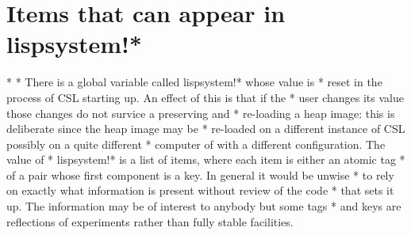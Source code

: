 \documentclass[a4paper,11pt]{article}
\begin{document}
\section{Items that can appear in {\ttfamily lispsystem!*}} \label{lispsys}
  *
  * There is a global variable called {\ttfamily lispsystem!*} whose value is
  * reset in the process of CSL starting up. An effect of this is that if the
  * user changes its value those changes do not survice a preserving and
  * re-loading a heap image: this is deliberate since the heap image may be
  * re-loaded on a different instance of CSL possibly on a quite different
  * computer of with a different configuration. The value of {\ttfamily
  * lispsystem!*} is a list of items, where each item is either an atomic tag
  * of a pair whose first component is a key. In general it would be unwise
  * to rely on exactly what information is present without review of the code
  * that sets it up. The information may be of interest to anybody but some tags
  * and keys are reflections of experiments rather than fully stable facilities.
\end{document}
